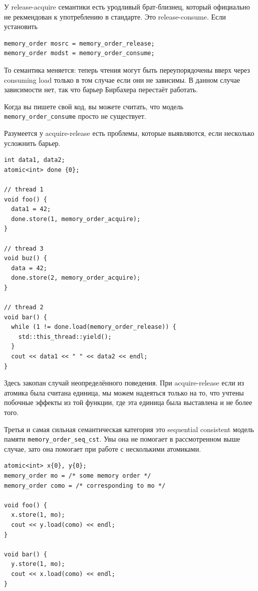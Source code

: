 \documentclass[a4paper,12pt,oneside]{book}
\begin{document}
У release-acquire семантики есть уродливый брат-близнец, который официально не рекмендован к употреблению в стандарте. Это release-consume. Если установить 

\begin{lstlisting}
memory_order mosrc = memory_order_release;
memory_order modst = memory_order_consume;
\end{lstlisting}

То семантика меняется: теперь чтения могут быть переупорядочены вверх через consuming load только в том случае если они не зависимы. В данном случае зависимости нет, так что барьер Бирбахера перестаёт работать.

Когда вы пишете свой код, вы можете считать, что модель \lstinline!memory_order_consume! просто не существует.

Разумеется у acquire-release есть проблемы, которые выявляются, если несколько усложнить барьер.

\begin{lstlisting}
int data1, data2;
atomic<int> done {0};

// thread 1
void foo() {
  data1 = 42;
  done.store(1, memory_order_acquire);
}

// thread 3
void buz() {
  data = 42;
  done.store(2, memory_order_acquire);
}

// thread 2
void bar() {
  while (1 != done.load(memory_order_release)) {
    std::this_thread::yield();
  }
  cout << data1 << " " << data2 << endl;  
}
\end{lstlisting}

Здесь закопан случай неопределённого поведения. При acquire-release если из атомика была считана единица, мы можем надеяться только на то, что учтены побочные эффекты из той функции, где эта единица была выставлена и не более того.

Третья и самая сильная семантическая категория это sequential consistent модель памяти \lstinline!memory_order_seq_cst!. Увы она не помогает в рассмотренном выше случае, зато она помогает при работе с несколькими атомиками.

\begin{lstlisting}
atomic<int> x{0}, y{0};
memory_order mo = /* some memory order */
memory_order como = /* corresponding to mo */

void foo() {
  x.store(1, mo);
  cout << y.load(como) << endl;
}

void bar() {
  y.store(1, mo);
  cout << x.load(como) << endl;
}
\end{lstlisting}
\end{document}
